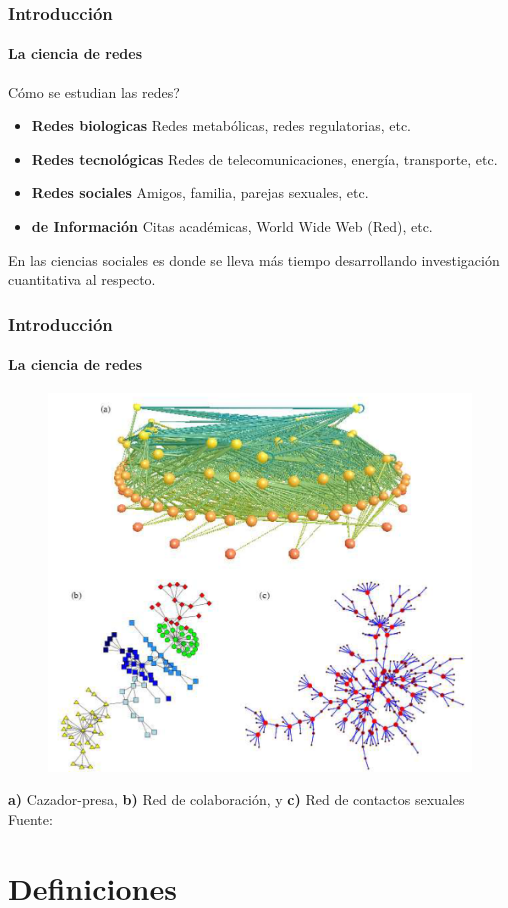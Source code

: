 \documentclass[10pt]{beamer}
\begin{document}
\begin{frame}
\frametitle{Introducci\'on}
\framesubtitle{La ciencia de redes}

C\'omo se estudian las redes?

\begin{itemize}
\item {\bf Redes biologicas} Redes metab\'olicas, redes regulatorias, etc.
\item {\bf Redes tecnol\'ogicas} Redes de telecomunicaciones, energ\'ia, transporte, etc.
\item {\bf Redes sociales} Amigos, familia, parejas sexuales, etc.
\item {\bf de Informaci\'on} Citas acad\'emicas, World Wide Web (Red), etc.
\end{itemize}

En las ciencias sociales es donde se lleva m\'as tiempo desarrollando
investigaci\'on cuantitativa al respecto.

\end{frame}

\begin{frame}
\frametitle{Introducci\'on}
\framesubtitle{La ciencia de redes}
\begin{figure}
\centering
\includegraphics[width =.6\linewidth]{../media/redes_newman_2003.png}
\end{figure}
{\bf a)} Cazador-presa, {\bf b)} Red de colaboraci\'on, y {\bf c)} Red de contactos sexuales
{\footnotesize Fuente: \cite{newman2003structure}}
\end{frame}

\section{Definiciones}
\end{document}
